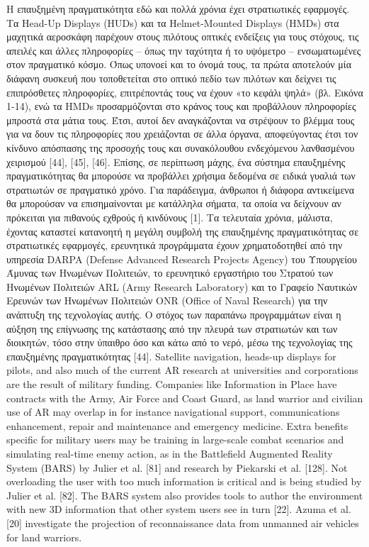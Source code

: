 Η επαυξημένη πραγματικότητα εδώ και πολλά χρόνια έχει στρατιωτικές εφαρμογές. Τα Head-Up Displays (HUDs) και τα Helmet-Mounted Displays (HMDs) στα μαχητικά αεροσκάφη παρέχουν στους πιλότους οπτικές ενδείξεις για τους στόχους, τις απειλές και άλλες πληροφορίες – όπως την ταχύτητα ή το υψόμετρο – ενσωματωμένες στον πραγματικό κόσμο. Όπως υπονοεί και το όνομά τους, τα πρώτα αποτελούν μία διάφανη συσκευή που τοποθετείται στο οπτικό πεδίο των πιλότων και δείχνει τις επιπρόσθετες πληροφορίες, επιτρέποντάς τους να έχουν «το κεφάλι ψηλά» (βλ. Εικόνα 1-14), ενώ τα HMDs προσαρμόζονται στο κράνος τους και προβάλλουν πληροφορίες μπροστά στα μάτια τους. Έτσι, αυτοί δεν αναγκάζονται να στρέψουν το βλέμμα τους για να δουν τις πληροφορίες που χρειάζονται σε άλλα όργανα, αποφεύγοντας έτσι τον κίνδυνο απόσπασης της προσοχής τους και συνακόλουθου ενδεχόμενου λανθασμένου χειρισμού [44], [45], [46]. Επίσης, σε περίπτωση μάχης, ένα σύστημα επαυξημένης πραγματικότητας θα μπορούσε να προβάλλει χρήσιμα δεδομένα σε ειδικά γυαλιά των στρατιωτών σε πραγματικό χρόνο. Για παράδειγμα, άνθρωποι ή διάφορα αντικείμενα θα μπορούσαν να επισημαίνονται με κατάλληλα σήματα, τα οποία να δείχνουν αν πρόκειται για πιθανούς εχθρούς ή κινδύνους [1]. Τα τελευταία χρόνια, μάλιστα, έχοντας καταστεί κατανοητή η μεγάλη συμβολή της επαυξημένης πραγματικότητας σε στρατιωτικές εφαρμογές, ερευνητικά προγράμματα έχουν χρηματοδοτηθεί από την υπηρεσία DARPA (Defense Advanced Research Projects Agency) του Υπουργείου Άμυνας των Ηνωμένων Πολιτειών, το ερευνητικό εργαστήριο του Στρατού των Ηνωμένων Πολιτειών ARL (Army Research Laboratory) και το Γραφείο Ναυτικών Ερευνών των Ηνωμένων Πολιτειών ONR (Office of Naval Research) για την ανάπτυξη της τεχνολογίας αυτής. Ο στόχος των παραπάνω προγραμμάτων είναι η αύξηση της επίγνωσης της κατάστασης από την πλευρά των στρατιωτών και των διοικητών, τόσο στην ύπαιθρο όσο και κάτω από το νερό, μέσω της τεχνολογίας της επαυξημένης πραγματικότητας [44].
Satellite navigation, heads-up displays for pilots, and also
much of the current AR research at universities and corporations
are the result of military funding. Companies like
Information in Place have contracts with the Army, Air Force
and Coast Guard, as land warrior and civilian use of AR may
overlap in for instance navigational support, communications
enhancement, repair and maintenance and emergency medicine.
Extra benefits specific for military users may be training
in large-scale combat scenarios and simulating real-time
enemy action, as in the Battlefield Augmented Reality System
(BARS) by Julier et al. [81] and research by Piekarski et
al. [128]. Not overloading the user with too much information
is critical and is being studied by Julier et al. [82]. The
BARS system also provides tools to author the environment
with new 3D information that other system users see in turn
[22]. Azuma et al. [20] investigate the projection of reconnaissance
data from unmanned air vehicles for land warriors.

